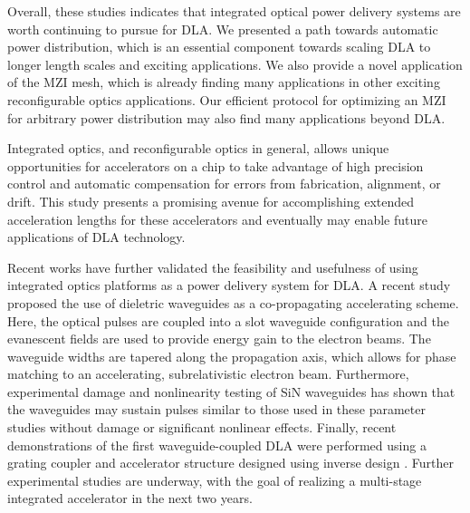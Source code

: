 Overall, these studies indicates that integrated optical power delivery systems are worth continuing to pursue for DLA.  We presented a path towards automatic power distribution, which is an essential component towards scaling DLA to longer length scales and exciting applications.  We also provide a novel application of the MZI mesh, which is already finding many applications in other exciting reconfigurable optics applications.  Our efficient protocol for optimizing an MZI for arbitrary power distribution may also find many applications beyond DLA.

Integrated optics, and reconfigurable optics in general, allows unique opportunities for accelerators on a chip to take advantage of high precision control and automatic compensation for errors from fabrication, alignment, or drift. This study presents a promising avenue for accomplishing extended acceleration lengths for these accelerators and eventually may enable future applications of DLA technology.

Recent works have further validated the feasibility and usefulness of using integrated optics platforms as a power delivery system for DLA. A recent study \cite{zhao_design_2018} proposed the use of dieletric waveguides as a co-propagating accelerating scheme.  Here, the optical pulses are coupled into a slot waveguide configuration and the evanescent fields are used to provide energy gain to the electron beams.  The waveguide widths are tapered along the propagation axis, which allows for phase matching to an accelerating, subrelativistic electron beam.  
Furthermore, experimental damage and nonlinearity testing of SiN waveguides has shown that the waveguides may sustain pulses similar to those used in these parameter studies \cite{tan2019silicon} without damage or significant nonlinear effects.
Finally, recent demonstrations of the first waveguide-coupled DLA were performed using a grating coupler and accelerator structure designed using inverse design \cite{sapra2019inverse,sapra_-chip_2019}.
Further experimental studies are underway, with the goal of realizing a multi-stage integrated accelerator in the next two years.
